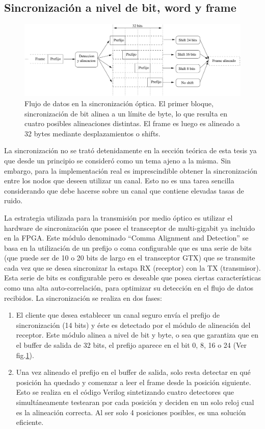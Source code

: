 \subsection{Sincronización a nivel de bit, word y frame}

\begin{figure}[t]
  \centering
    \includegraphics[width=6in]{graphs/optsync.pdf}
\caption {Flujo de datos en la sincronización óptica. El primer bloque, sincronización de bit alinea a un límite de byte, lo que resulta en cuatro posibles alineaciones distintas. El frame es luego es alineado a 32 bytes mediante desplazamientos o shifts.}
\label{fig:optsync}
\end{figure}


La sincronización no se trató detenidamente en la sección teórica de esta tesis ya que desde un principio se consideró como un tema ajeno a la misma. Sin embargo, para la implementación real es imprescindible obtener la sincronización entre los nodos que deseen utilizar un canal. Esto no es una tarea sencilla considerando que debe hacerse sobre un canal que contiene elevadas tasas de ruido.

La estrategia utilizada para la transmisión por medio óptico es utilizar el hardware de sincronización que posee el transceptor de multi-gigabit ya incluido en la FPGA. Este módulo \cite{ug198} denominado ``Comma Alignment and Detection'' se basa en la utilización de un prefijo o coma configurable que es una serie de bits (que puede ser de 10 o 20 bits de largo en el transceptor GTX) que se transmite cada vez que se desea sincronizar la estapa RX (receptor) con la TX (transmisor). Esta serie de bits es configurable pero es deseable que posea ciertas características como una alta auto-correlación, para optimizar su detección en el flujo de datos recibidos.
La sincronización se realiza en dos fases:
\begin{enumerate}
 \item El cliente que desea establecer un canal seguro envía el prefijo de sincronización (14 bits) y éste es detectado por el módulo de alineación del receptor. Este módulo alinea a nivel de bit y byte, o sea que garantiza que en el buffer de salida de 32 bits, el prefijo aparece en el bit 0, 8, 16 o 24 (Ver fig.\ref{fig:optsync}).
 \item Una vez alineado el prefijo en el buffer de salida, solo resta detectar en qué posición ha quedado y comenzar a leer el frame desde la posición siguiente. Esto se realiza en el código Verilog sintetizando cuatro detectores que simultáneamente testearan por cada posición y deciden en un solo reloj cual es la alineación correcta. Al ser solo 4 posiciones posibles, es una solución eficiente.
\end{enumerate}


